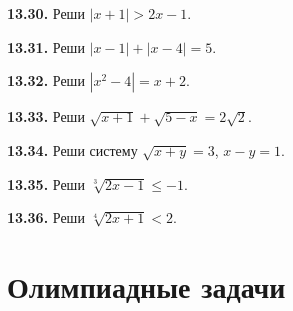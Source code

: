 \noindent\begin{minipage}[t]{\linewidth}\textbf{13.30.}\starmark{} Реши \(|x+1|>2x-1\).\par\end{minipage}\par
\noindent\begin{minipage}[t]{\linewidth}\textbf{13.31.} Реши \(|x-1|+|x-4|=5\).\par\end{minipage}\par
\noindent\begin{minipage}[t]{\linewidth}\textbf{13.32.}\starmark{} Реши \(|x^2-4|=x+2\).\par\end{minipage}\par
\noindent\begin{minipage}[t]{\linewidth}\textbf{13.33.}\starmark{} Реши \(\sqrt{x+1}+\sqrt{5-x}=2\sqrt2\).\par\end{minipage}\par
\noindent\begin{minipage}[t]{\linewidth}\textbf{13.34.} Реши систему \(\sqrt{x+y}=3\), \(x-y=1\).\par\end{minipage}\par
\noindent\begin{minipage}[t]{\linewidth}\textbf{13.35.} Реши \(\sqrt[3]{2x-1}\leq-1\).\par\end{minipage}\par
\noindent\begin{minipage}[t]{\linewidth}\textbf{13.36.}\starmark{} Реши \(\sqrt[4]{2x+1}<2\).\par\end{minipage}\par
\par{}\section*{Олимпиадные задачи}
